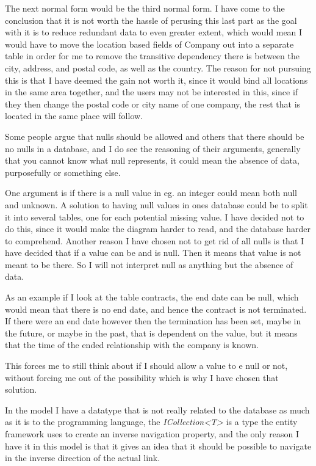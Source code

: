 The next normal form would be the third normal form. I have come to the conclusion that it is not worth the hassle of perusing this last part as the goal with it is to reduce redundant data to even greater extent, which would mean I would have to move the location based fields of Company out into a separate table in order for me to remove the transitive dependency\cite[p.~436]{DB_systems} there is between the city, address, and postal code, as well as the country. The reason for not pursuing this is that I have deemed the gain not worth it, since it would bind all locations in the same area together, and the users may not be interested in this, since if they then change the postal code or city name of one company, the rest that is located in the same place will follow.

Some people argue that nulls should be allowed and others that there should be no nulls in a database\cite{stackexchange:db:nullfields}, and I do see the reasoning of their arguments, generally that you cannot know what null represents, it could mean the absence of data, purposefully or something else.

One argument is if there is a null value in eg. an integer could mean both null and unknown. A solution to having null values in ones database could be to split it into several tables, one for each potential missing value. I have decided not to do this, since it would make the diagram harder to read, and the database harder to comprehend. Another reason I have chosen not to get rid of all nulls is that I have decided that if a value can be and is null. Then it means that value is not meant to be there. So I will not interpret null as anything but the absence of data.

As an example if I look at the table contracts, the end date can be null, which would mean that there is no end date, and hence the contract is not terminated. If there were an end date however then the termination has been set, maybe in the future, or maybe in the past, that is dependent on the value, but it means that the time of the ended relationship with the company is known.

This forces me to still think about if I should allow a value to e null or not, without forcing me out of the possibility which is why I have chosen that solution.

In the model I have a datatype that is not really related to the database as much as it is to the programming language, the \textit{ICollection<T>} is a type the entity framework uses to create an inverse navigation property, and the only reason I have it in this model is that it gives an idea that it should be possible to navigate in the inverse direction of the actual link.

